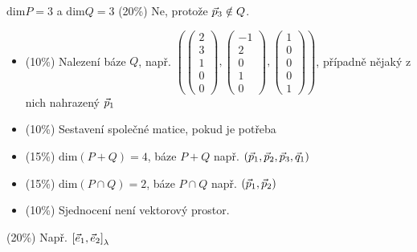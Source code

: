 \documentclass{article}
\newcommand{\mathdim}{\ensuremath{\mathrm{dim}}}
\newcommand{\mathvec}{\ensuremath{\vec}}
\begin{document}
\begin{Answer}[ref=subspaces]
	\( \mathdim P = 3 \) a \( \mathdim Q = 3 \)
	\Question (20\%) \quad Ne, protože \( \mathvec{p}_3 \notin Q \).
	\Question \begin{itemize}
		\item (10\%) \quad Nalezení báze \( Q \), např. \( \left( \begin{pmatrix} 2 \\ 3 \\ 1 \\ 0 \\ 0 \end{pmatrix}, \begin{pmatrix} -1 \\ 2 \\ 0 \\ 1 \\ 0 \end{pmatrix}, \begin{pmatrix} 1 \\ 0 \\ 0 \\ 0 \\ 1 \end{pmatrix} \right) \), případně nějaký z nich nahrazený \( \mathvec{p}_1 \)
		\item (10\%) \quad Sestavení společné matice, pokud je potřeba
		\item (15\%) \quad \( \mathdim{(P + Q)} = 4 \), báze \( P + Q \) např. \( \left( \mathvec{p}_1, \mathvec{p}_2, \mathvec{p}_3, \mathvec{q}_1 \right) \)
		\item (15\%) \quad \( \mathdim{(P \cap Q)} = 2 \), báze \( P \cap Q \) např. \( \left( \mathvec{p}_1, \mathvec{p}_2 \right) \)
		\item (10\%) \quad Sjednocení není vektorový prostor.
	\end{itemize}
	\Question (20\%) \quad Např. \( \left[ \mathvec{e}_1, \mathvec{e}_2 \right]_\lambda \)
\end{Answer}

\newpage
\end{document}
